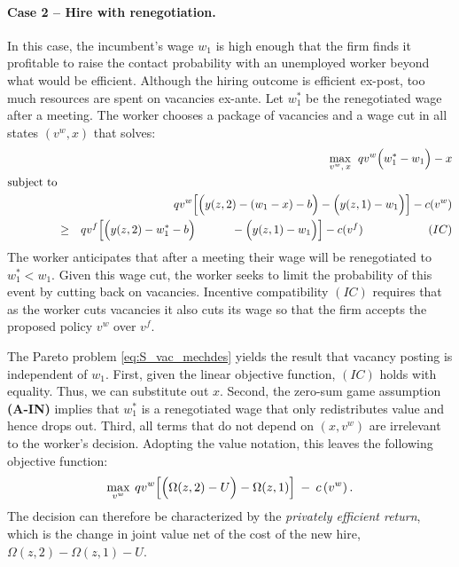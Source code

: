 \vspace*{-.2cm}\paragraph{Case 2 -- Hire with renegotiation.}
In this case, the incumbent's wage $w_1$ is high enough that the firm finds it profitable to raise the contact probability with an unemployed worker beyond what would be efficient. Although the hiring outcome is efficient ex-post, too much resources are spent on vacancies ex-ante. Let $w_1^{\ast}$ be the renegotiated wage after a meeting.
The worker chooses a package of vacancies and a wage cut in all states $(v^w,x)$ that solves:
\vspace*{-.3cm}\begin{eqnarray}
&&\max_{v^w,\:x}\:\: qv^w\Big(w_1^\ast - w_1\Big) - x
\label{eq:S_vac_mechdes} \\
\text{subject to}&&  \notag \\
&& q v^w \Big[ \Big( y(z,2) - (w_1-x) - b \Big) - \Big( y(z,1) - w_1 \Big) \Big] - c(v^w) \notag \\
&\geq & q v^f \Big[ \Big( y(z,2) - w_1^* - b \Big) \hspace{1.1cm} - \Big( y(z,1) - w_1 \Big) \Big] - c(v^f) \hspace{2cm}(IC) \notag
\vspace*{-.3cm}\end{eqnarray}
The worker anticipates that after a meeting their wage will be renegotiated to $w_1^\ast<w_1$. Given this wage cut, the worker seeks to limit the probability of this event by cutting back on vacancies. Incentive compatibility $(IC)$ requires that as the worker cuts vacancies it also cuts its wage so that the firm accepts the proposed policy $v^w$ over $v^f$.

The Pareto problem \eqref{eq:S_vac_mechdes} yields the result that vacancy posting is independent of $w_1$. First, given the linear objective function, $(IC)$ holds with equality. Thus, we can substitute out $x$. Second, the zero-sum game assumption \textbf{(A-IN)} implies that $w_1^\ast$ is a renegotiated wage that only redistributes value and hence drops out. Third, all terms that do not depend on $(x,v^w)$ are irrelevant to the worker's decision. Adopting the value notation, this leaves the following objective function:
\vspace*{-.3cm}\begin{equation*}
\max_{v^w}\:qv^w\Big[
\Big( \Omega(z,2) - U\Big)
-
\Omega(z,1) \Big]
\:-\: c\left(v^w\right).
\vspace*{-.3cm}\end{equation*}
The decision can therefore be characterized by the \emph{privately efficient return}, which is the change in joint value net of the cost of the new hire, $\Omega(z,2)-\Omega(z,1) - U$.

